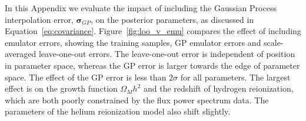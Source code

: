 In this Appendix we evaluate the impact of including the Gaussian Process interpolation error, $\boldsymbol{\sigma}_{GP}$, on the posterior parameters, as discussed in Equation~\ref{eq:covariance}.
Figure~\ref{fig:loo_v_emu} compares the effect of including emulator errors, showing the training samples, GP emulator errors and scale-averaged leave-one-out errors.
The leave-one-out error is independent of position in parameter space, whereas the GP error is larger towards the edge of parameter space.
The effect of the GP error is less than $2\sigma$ for all parameters.
The largest effect is on the growth function $\Omega_M h^2$ and the redshift of hydrogen reionization, which are both poorly constrained by the flux power spectrum data.
The parameters of the helium reionization model also shift slightly. 







